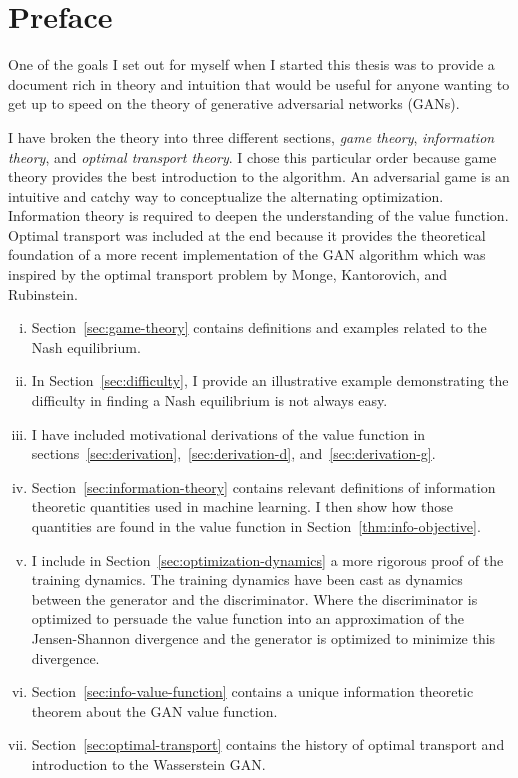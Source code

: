 \section*{Preface}

One of the goals I set out for myself when I started this thesis was
to provide a document rich in theory and intuition that would be
useful for anyone wanting to get up to speed on the theory of
generative adversarial networks (GANs).

I have broken the theory into three different sections, \textit{game
  theory}, \textit{information theory}, and \textit{optimal transport
  theory}.  I chose this particular order because game theory provides
the best introduction to the algorithm.  An adversarial game is an
intuitive and catchy way to conceptualize the alternating
optimization.  Information theory is required to deepen the
understanding of the value function.  Optimal transport was included
at the end because it provides the theoretical foundation of a more
recent implementation of the GAN algorithm which was inspired by the
optimal transport problem by Monge, Kantorovich, and Rubinstein.


\begin{enumerate}[(i)]
\item Section~\ref{sec:game-theory} contains definitions and examples
  related to the Nash equilibrium.
\item In Section~\ref{sec:difficulty}, I provide an illustrative
  example demonstrating the difficulty in finding a Nash equilibrium
  is not always easy.
\item I have included motivational derivations of the value function
  in sections~\ref{sec:derivation},~\ref{sec:derivation-d},
  and~\ref{sec:derivation-g}.
\item Section~\ref{sec:information-theory} contains relevant
  definitions of information theoretic quantities used in machine
  learning. I then show how those quantities are found in the value
  function in Section~\ref{thm:info-objective}.
\item I include in Section~\ref{sec:optimization-dynamics} a more
  rigorous proof of the training dynamics.  The training dynamics have
  been cast as dynamics between the generator and the discriminator.
  Where the discriminator is optimized to persuade the value function
  into an approximation of the Jensen-Shannon divergence and the
  generator is optimized to minimize this divergence.
\item Section~\ref{sec:info-value-function} contains a unique
  information theoretic theorem about the GAN value function.
\item Section~\ref{sec:optimal-transport} contains the history of
  optimal transport and introduction to the Wasserstein GAN.
\end{enumerate}

